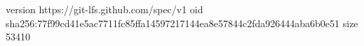 version https://git-lfs.github.com/spec/v1
oid sha256:77f99cd41e5ac7711fc85ffa14597217144ea8e57844c2fda926444aba6b0e51
size 53410
